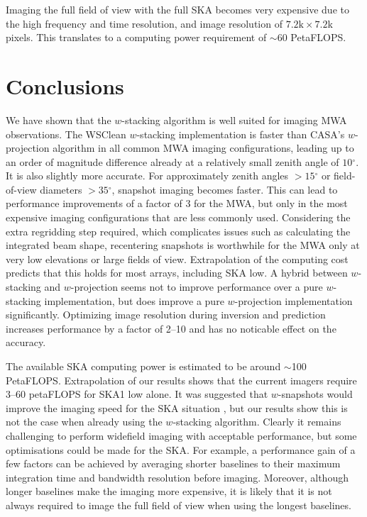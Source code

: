 \documentclass[useAMS,usenatbib]{mn2e}
\newcommand{\degree}{\ensuremath{^{\circ}}\xspace}
\begin{document}
Imaging the full field of view with the full SKA becomes very expensive due to the high frequency and time resolution, and image resolution of $7.2\textrm{k} \times 7.2$k pixels. This translates to a computing power requirement of $\sim60$ PetaFLOPS.

\section{Conclusions} \label{sec:conclusions}
We have shown that the $w$-stacking algorithm is well suited for imaging MWA observations. The WSClean $w$-stacking implementation is faster than CASA's $w$-projection algorithm in all common MWA imaging configurations, leading up to an order of magnitude difference already at a relatively small zenith angle of $10$\degree. It is also slightly more accurate. For approximately zenith angles $>15\degree$ or field-of-view diameters $>35\degree$, snapshot imaging becomes faster. This can lead to performance improvements of a factor of $3$ for the MWA, but only in the most expensive imaging configurations that are less commonly used. Considering the extra regridding step required, which complicates issues such as calculating the integrated beam shape, recentering snapshots is worthwhile for the MWA only at very low elevations or large fields of view. Extrapolation of the computing cost predicts that this holds for most arrays, including SKA low. A hybrid between $w$-stacking and $w$-projection seems not to improve performance over a pure $w$-stacking implementation, but does improve a pure $w$-projection implementation significantly. Optimizing image resolution during inversion and prediction increases performance by a factor of 2--10 and has no noticable effect on the accuracy.

The available SKA computing power is estimated to be around $\sim$100 PetaFLOPS. Extrapolation of our results shows that the current imagers require $3$--$60$ petaFLOPS for SKA1 low alone. It was suggested that $w$-snapshots would improve the imaging speed for the SKA situation \citep{widefield-imaging-ska-cornwell}, but our results show this is not the case when already using the $w$-stacking algorithm. Clearly it remains challenging to perform widefield imaging with acceptable performance, but some optimisations could be made for the SKA. For example, a performance gain of a few factors can be achieved by averaging shorter baselines to their maximum integration time and bandwidth resolution before imaging. Moreover, although longer baselines make the imaging more expensive, it is likely that it is not always required to image the full field of view when using the longest baselines.
\end{document}
